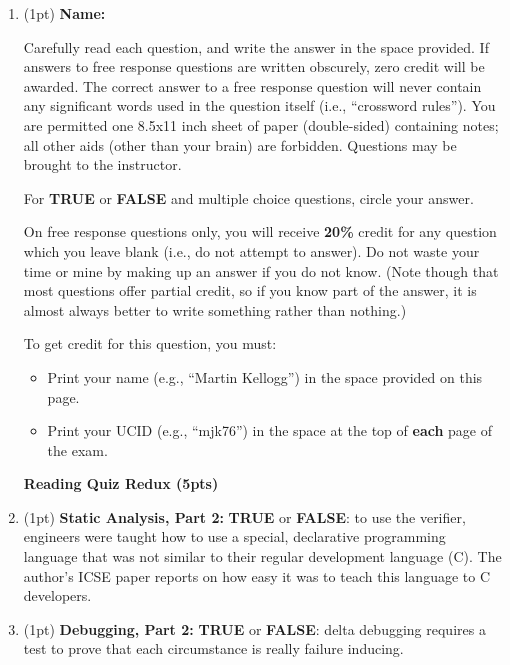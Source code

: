 \documentclass{article}
\newif\ifkey
\newcommand{\correct}[1]{\ifkey\color{red}\textbf{#1}\color{black}\else\textbf{#1}\fi\xspace}
\newcommand*{\pts}[1]{\addtocounter{points}{#1}(#1pt)}
\begin{document}
\begin{spacing}{1.4}

\begin{enumerate}[leftmargin=*]
\item \pts{1} \textbf{Name:} \hrulefill

Carefully read each question, and write the answer in the space
provided.  If answers to free response questions are written obscurely,
zero credit will be awarded. The correct answer to a free response question
will never contain any significant words used in the question itself (i.e., ``crossword rules'').
You are permitted one 8.5x11 inch sheet of paper (double-sided)
containing notes; all other aids (other than your brain) are forbidden.
Questions may be brought to the instructor.

For \textbf{TRUE} or \textbf{FALSE} and multiple choice questions,
circle your answer.

On free response questions only, you will receive \textbf{20\%} credit
for any question which you leave blank (i.e., do not attempt to
answer). Do not waste your time or mine by making up an answer if you
do not know. (Note though that most questions offer partial credit, so
if you know part of the answer, it is almost always better to write something
rather than nothing.)

To get credit for this question, you must:
\begin{itemize}
\item Print your name (e.g., ``Martin Kellogg'') in the space provided on this page.
\item Print your UCID (e.g., ``mjk76'') in the space at the top of \textbf{each} page of the exam.
\end{itemize}
  
\newpage

\textbf{Reading Quiz Redux (5pts)}

\item \pts{1}
  \textbf{Static Analysis, Part 2:} \textbf{TRUE} or
  \correct{FALSE}: to use the verifier, engineers were taught how to
  use a special, declarative programming language that was not similar
  to their regular development language (C). The author's ICSE paper
  reports on how easy it was to teach this language to C developers.

\item \pts{1}
  \textbf{Debugging, Part 2:} \correct{TRUE} or \textbf{FALSE}:
  delta debugging requires a test to prove that each circumstance is really failure inducing.


\end{enumerate}
\end{spacing}
\end{document}
